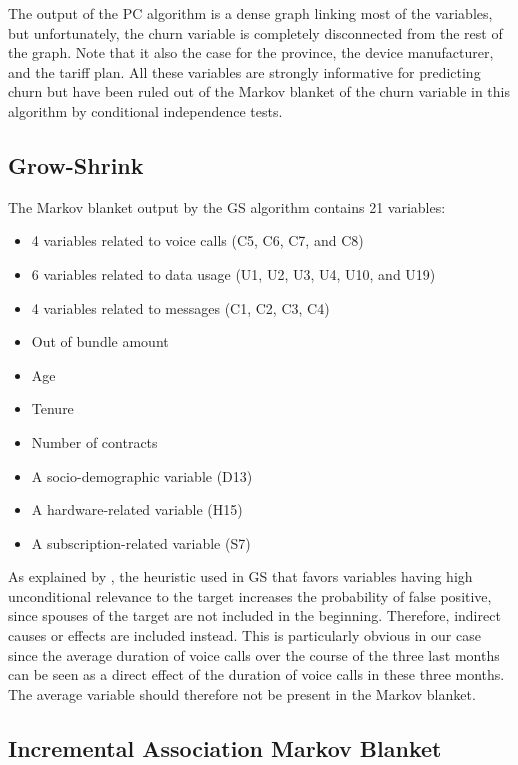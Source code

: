 The output of the PC algorithm is a dense graph linking most of the variables,
but unfortunately, the churn variable is completely disconnected from the rest of
the graph. Note that it also the case for the province, the device manufacturer,
and the tariff plan. All these variables are strongly informative for predicting
churn but have been ruled out of the Markov blanket of the churn variable in
this algorithm by conditional independence tests.

\subsection{Grow-Shrink}

The Markov blanket output by the GS algorithm contains 21 variables:

\begin{itemize}
    \item 4 variables related to voice calls (C5, C6, C7, and C8)
    \item 6 variables related to data usage (U1, U2, U3, U4, U10, and U19)
    \item 4 variables related to messages (C1, C2, C3, C4)
    \item Out of bundle amount
    \item Age
    \item Tenure
    \item Number of contracts
    \item A socio-demographic variable (D13)
    \item A hardware-related variable (H15)
    \item A subscription-related variable (S7)
\end{itemize}

As explained by \textcite{tsamardinos2003algorithms}, the heuristic used in GS
that favors variables having high unconditional relevance to the target
increases the probability of false positive, since spouses of the target are not
included in the beginning. Therefore, indirect causes or effects are included
instead. This is particularly obvious in our case since the average duration of
voice calls over the course of the three last months can be seen as a direct
effect of the duration of voice calls in these three months. The average
variable should therefore not be present in the Markov blanket.

\subsection{Incremental Association Markov Blanket}

